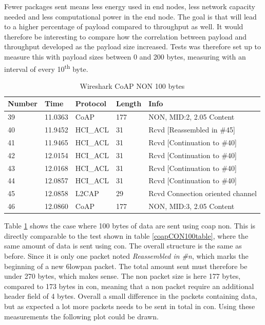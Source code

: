 \noindent Fewer packages sent means less energy used in end nodes, less network capacity needed and less computational power in the end node. The goal is that will lead to a higher percentage of \gls{payload} compared to throughput as well. It would therefore be interesting to compare how the correlation between \gls{payload} and \gls{throughput} developed as the \gls{payload} size increased. Tests was therefore set up to measure this with \gls{payload} sizes between 0 and 200 bytes, measuring with an interval of every 10\textsuperscript{th} byte.

\begin{table}[H]
\small
\centering
\caption{Wireshark CoAP NON 100 bytes}
\label{coapNON100table}
\begin{tabular}{lllll}
\hline
Number & Time    & Protocol & Length & Info   							  \\ \hline                          
39     & 11.0363 & CoAP     & 177    & NON, MID:2, 2.05 Content         \\
40     & 11.9452 & HCI\_ACL & 31     & Rcvd {[}Reassembled in \#45{]}   \\
41     & 11.9465 & HCI\_ACL & 31     & Rcvd {[}Continuation to \#40{]}  \\
42     & 12.0154 & HCI\_ACL & 31     & Rcvd {[}Continuation to \#40{]}  \\
43     & 12.0168 & HCI\_ACL & 31     & Rcvd {[}Continuation to \#40{]}  \\
44     & 12.0857 & HCI\_ACL & 31     & Rcvd {[}Continuation to \#40{]}  \\
45     & 12.0858 & L2CAP    & 29     & Rcvd Connection oriented channel \\
46     & 12.0860 & CoAP     & 177    & NON, MID:3, 2.05 Content         \\ \hline
\end{tabular}
\end{table}

\noindent Table \ref{coapNON100table} shows the case where 100 bytes of data are sent using \gls{coap} \gls{non}. This is directly comparable to the test shown in table \ref{coapCON100table}, where the same amount of data is sent using \gls{con}. The overall structure is the same as before. Since it is only one packet noted \textit{Reassembled in \#n}, which marks the beginning of a new \gls{6lowpan} packet. The total amount sent must therefore be under 270 bytes, which makes sense. The \gls{non} packet size is here 177 bytes, compared to 173 bytes in \gls{con}, meaning that a \gls{non} packet require an additional header field of 4 bytes. Overall a small difference in the packets containing data, but as expected a lot more packets needs to be sent in total in \gls{con}. Using these measurements the following plot could be drawn. 

